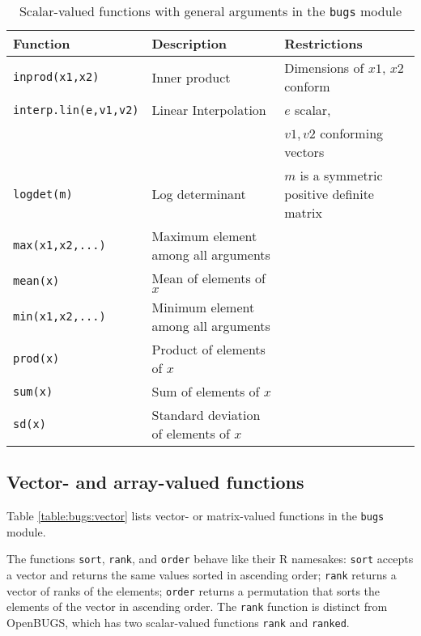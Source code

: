 \documentclass[11pt, a4paper, titlepage]{report}
\newcommand{\OpenBUGS}{\textsf{OpenBUGS}}
\begin{document}
\begin{table}
\begin{tabular}{lll}
\hline
Function & Description & Restrictions \\
\hline
\verb+inprod(x1,x2)+ & Inner product & Dimensions of $x1$, $x2$ conform \\
\verb+interp.lin(e,v1,v2)+ & Linear Interpolation & $e$ scalar, \\
                          &                     & $v1,v2$ conforming vectors \\
\verb+logdet(m)+ & Log determinant & $m$ is a symmetric positive definite matrix \\
\verb+max(x1,x2,...)+ & Maximum element among all arguments & \\
\verb+mean(x)+  & Mean of elements of $x$ & \\
\verb+min(x1,x2,...)+ & Minimum element among all arguments & \\
\verb+prod(x)+  & Product of elements of $x$ & \\
\verb+sum(x)+   & Sum of elements of $x$& \\
\verb+sd(x)+    & Standard deviation of elements of $x$ & \\
\hline
\end{tabular}
\caption{Scalar-valued functions with general
  arguments in the \texttt{bugs} module \label{table:bugs:scalar2}}
\end{table}

\subsection{Vector- and array-valued functions}

Table \ref{table:bugs:vector} lists vector- or matrix-valued functions
in the \texttt{bugs} module.

The functions \texttt{sort}, \texttt{rank}, and \texttt{order} behave
like their R namesakes: \texttt{sort} accepts a vector and returns the
same values sorted in ascending order; \texttt{rank} returns a vector
of ranks of the elements; \texttt{order} returns a permutation that
sorts the elements of the vector in ascending order. The \texttt{rank}
function is distinct from \OpenBUGS, which has two scalar-valued
functions \verb+rank+ and \verb+ranked+.
\end{document}

